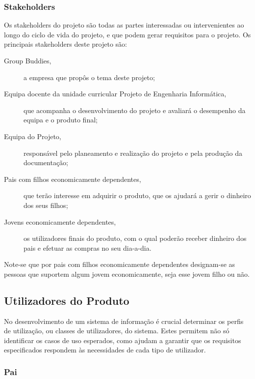 \documentclass{article}
\begin{document}
    \subsubsection{Stakeholders}  

      Os stakeholders do projeto são todas as partes interessadas ou intervenientes ao longo do ciclo de vida do projeto, e que podem gerar requisitos para o projeto. Os principais stakeholders deste projeto são:

        \begin{description}
          \item[Group Buddies,]a empresa que propôs o tema deste projeto;
          \item[Equipa docente da unidade curricular Projeto de Engenharia Informática,] que acompanha o desenvolvimento do projeto e avaliará o desempenho da equipa e o produto final;
          \item[Equipa do Projeto,] responsável pelo planeamento e realização do projeto e pela produção da documentação;
          \item[Pais com filhos economicamente dependentes,]que terão interesse em adquirir o produto, que os ajudará a gerir o dinheiro dos seus filhos;
          \item[Jovens economicamente dependentes,] os utilizadores finais do produto, com o qual poderão receber dinheiro dos pais e efetuar as compras no seu dia-a-dia.
        \end{description}

      Note-se que por pais com filhos economicamente dependentes designam-se as pessoas que suportem algum jovem economicamente, seja esse jovem filho ou não.

  \subsection{Utilizadores do Produto}

    No desenvolvimento de um sistema de informação é crucial determinar os perfis de utilização, ou classes de utilizadores, do sistema. Estes permitem não só identificar os casos de uso esperados, como ajudam a garantir que os requisitos especificados respondem às necessidades de cada tipo de utilizador.

    \subsubsection{Pai}
\end{document}
